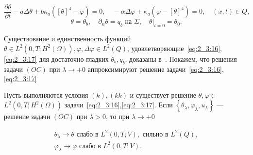 \begin{equation}
    \label{eq:2_3:16}
    \frac{\partial \theta}{\partial t}-a \Delta \theta
    + b \kappa_{a}\left([\theta]^{4}
    - \varphi\right)=0, \quad-\alpha \Delta \varphi
    + \kappa_{a}\left(\varphi-[\theta]^{4}\right) = 0,
    \quad(x, t) \in Q,
\end{equation}
\begin{equation}
    \label{eq:2_3:17}
    \theta=\theta_{b}, \quad \partial_{n} \theta= q_{b} \text { на } \Sigma,
    \left.\quad \theta\right|_{t=0} = \theta_{0}.
\end{equation}


Существование и единственность функций $\theta \in L^{2}\left(0, T; H^{2}(\Omega)\right),
\varphi, \Delta \varphi \in L^{2}( Q)$, удовлетворяющие~\eqref{eq:2_3:16},\eqref{eq:2_3:17}
для достаточно гладких $\theta_{b}, q_{b}$, доказаны в~\cite{Chebotarev2019Problem}.
Покажем, что решения задачи $(OC)$ при $\lambda \rightarrow+0$
аппроксимируют решение задачи~\eqref{eq:2_3:16},\eqref{eq:2_3:17}

\begin{theorem}
    \label{th:2_3:3}
    Пусть выполняются условия $(k), (kk)$ и существует решение
    $\theta, \varphi \in$ $L^{2}\left(0, T ; H^{2}(\Omega) \right)$
    задачи~\eqref{eq:2_3:16},\eqref{eq:2_3:17}.
    Если $\left\{\theta_{\lambda}, \varphi_{\lambda}, u_{\lambda}\right\}$
    — решение задачи $(OC)$ при $\lambda>0$, то при $\lambda\rightarrow+0$

    \[
        \begin{gathered}
            \theta_{\lambda} \rightarrow \theta \text { слабо в } L^{2}(0, T ; V),
            \text { сильно в } L^{2}(Q), \\
            \varphi_{\lambda} \rightarrow \varphi \text { слабо в } L^{2}(0, T ; V).
        \end{gathered}
    \]
\end{theorem}

